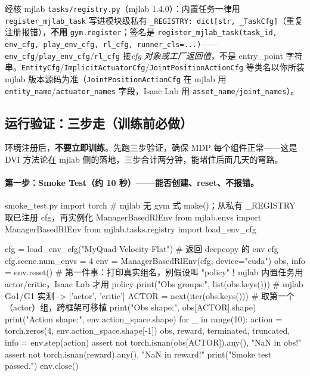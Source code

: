 \begin{note}
经核 mjlab \texttt{tasks/registry.py}（mjlab 1.4.0）：内置任务一律用 \verb|register_mjlab_task| 写进模块级私有 \verb|_REGISTRY: dict[str, _TaskCfg]|（重复注册报错），\textbf{不用} \verb|gym.register|；签名是 \verb|register_mjlab_task(task_id, env_cfg, play_env_cfg, rl_cfg, runner_cls=...)|——\verb|env_cfg|/\verb|play_env_cfg|/\verb|rl_cfg| 接\emph{cfg 对象或工厂返回值}，不是 entry\_point 字符串。\verb|EntityCfg|/\verb|ImplicitActuatorCfg|/\verb|JointPositionActionCfg| 等类名以你所装 mjlab 版本源码为准（\verb|JointPositionActionCfg| 在 mjlab 用 \verb|entity_name|/\verb|actuator_names| 字段，Isaac Lab 用 \verb|asset_name|/\verb|joint_names|）。
\end{note}

\subsection{运行验证：三步走（训练前必做）}
\label{sec:rlmc-diy-threestep}

环境注册后，\textbf{不要立即训练}。先跑三步验证，确保 MDP 每个组件正常——这是 DVI 方法论在 mjlab 侧的落地，三步合计两分钟，能堵住后面几天的弯路。

\paragraph{第一步：Smoke Test（约 10 秒）——能否创建、reset、不报错。}

\begin{codebox}[Python]{smoke\_test.py}
import torch
# mjlab 无 gym 式 make()；从私有 _REGISTRY 取已注册 cfg，再实例化 ManagerBasedRlEnv
from mjlab.envs import ManagerBasedRlEnv
from mjlab.tasks.registry import load_env_cfg

cfg = load_env_cfg("MyQuad-Velocity-Flat")        # 返回 deepcopy 的 env cfg
cfg.scene.num_envs = 4
env = ManagerBasedRlEnv(cfg, device="cuda")
obs, info = env.reset()
# 第一件事：打印真实组名，别假设叫 "policy"！mjlab 内置任务用 actor/critic，Isaac Lab 才用 policy
print("Obs groups:", list(obs.keys()))            # mjlab Go1/G1 实测 -> ['actor', 'critic']
ACTOR = next(iter(obs.keys()))                    # 取第一个（actor）组，跨框架可移植
print("Obs  shape:", obs[ACTOR].shape)
print("Action shape:", env.action_space.shape)
for _ in range(10):
    action = torch.zeros(4, env.action_space.shape[-1])
    obs, reward, terminated, truncated, info = env.step(action)
    assert not torch.isnan(obs[ACTOR]).any(), "NaN in obs!"
    assert not torch.isnan(reward).any(),     "NaN in reward!"
print("Smoke test passed.")
env.close()
\end{codebox}


